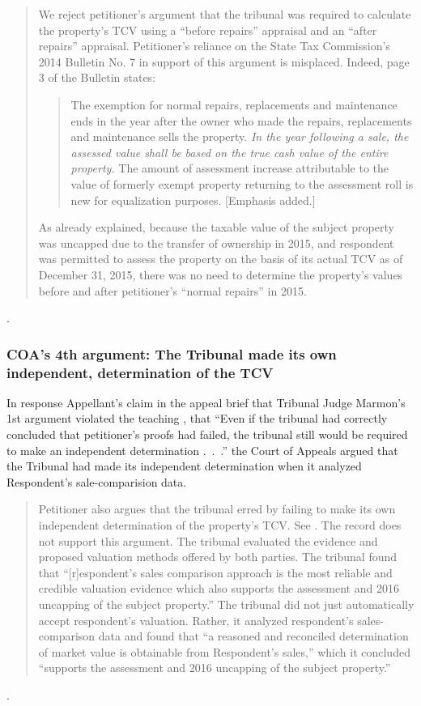 \documentclass[12pt,\documentclassflag]{michiganCourtOfAppealsBrief}
\begin{document}
\begin{quotation}
We reject petitioner's argument that the tribunal was required to calculate the property's
TCV using a ``before repairs'' appraisal and an ``after repairs'' appraisal. Petitioner's reliance on
the State Tax Commission's 2014 Bulletin No. 7 in support of this argument is misplaced. Indeed,
page 3 of the Bulletin states:

\begin{quote}
  The exemption for normal repairs, replacements and maintenance ends in
the year after the owner who made the repairs, replacements and maintenance sells
the property. \emph{In the year following a sale, the assessed value shall be based on the
true cash value of the entire property.} The amount of assessment increase
attributable to the value of formerly exempt property returning to the assessment
roll is new for equalization purposes. [Emphasis added.]
\end{quote}

As already explained, because the taxable value of the subject property was uncapped due to the
transfer of ownership in 2015, and respondent was permitted to assess the property on the basis of
its actual TCV as of December 31, 2015, there was no need to determine the property's values
before and after petitioner's ``normal repairs'' in 2015.
\end{quotation}
.


\subsubsection{COA's 4th argument: The Tribunal made its own independent, determination of the TCV}

In response Appellant's claim in the appeal brief that Tribunal Judge Marmon's 1st argument violated the teaching , that  ``Even if the tribunal had correctly concluded that petitioner's proofs had failed, the tribunal still would be required to make an independent determination .~.~.'' the Court of Appeals argued that the Tribunal had made its independent determination when it analyzed Respondent's sale-comparision data.

\begin{quotation}
  Petitioner also argues that the tribunal erred by failing to make its own independent
determination of the property's TCV. See .
The record does not support this argument. The
tribunal evaluated the evidence and proposed valuation methods offered by both parties. The
tribunal found that ``[r]espondent's sales comparison approach is the most reliable and credible
valuation evidence which also supports the assessment and 2016 uncapping of the subject
property.'' The tribunal did not just automatically accept respondent's valuation. Rather, it
analyzed respondent's sales-comparison data and found that ``a reasoned and reconciled
determination of market value is obtainable from Respondent's sales,'' which it concluded
``supports the assessment and 2016 uncapping of the subject property.''
\end{quotation}
.
\end{document}
